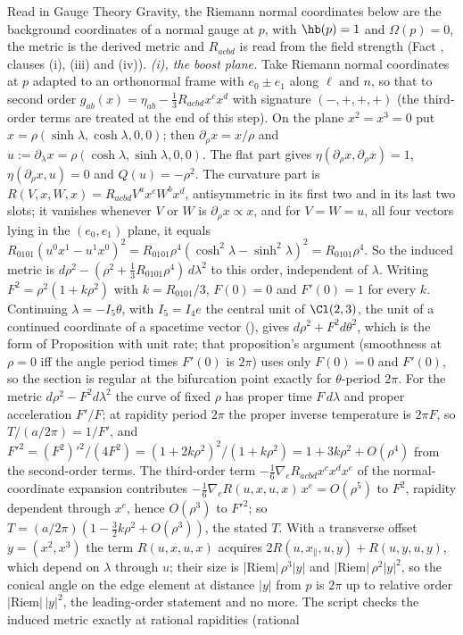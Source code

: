 Read in Gauge Theory Gravity, the Riemann normal coordinates below are the background coordinates of a normal gauge at $p$, with $\hb(p) = 1$ and $\Omega(p) = 0$, the metric is the derived metric and $R_{acbd}$ is read from the field strength (Fact , clauses (i), (iii) and (iv)). \emph{(i), the boost plane.} Take Riemann normal coordinates at $p$ adapted to an orthonormal frame with $e_{0} \pm e_{1}$ along $\ell$ and $n$, so that to second order $g_{ab}(x) = \eta_{ab} - \tfrac13 R_{acbd}x^{c}x^{d}$ with signature $(-,+,+,+)$ (the third-order terms are treated at the end of this step). On the plane $x^{2} = x^{3} = 0$ put $x = \rho(\sinh\lambda, \cosh\lambda, 0, 0)$; then $\partial_{\rho}x = x/\rho$ and $u := \partial_{\lambda}x = \rho(\cosh\lambda, \sinh\lambda, 0, 0)$. The flat part gives $\eta(\partial_{\rho}x, \partial_{\rho}x) = 1$, $\eta(\partial_{\rho}x, u) = 0$ and $Q(u) = -\rho^{2}$. The curvature part is $R(V, x, W, x) = R_{acbd}V^{a}x^{c}W^{b}x^{d}$, antisymmetric in its first two and in its last two slots; it vanishes whenever $V$ or $W$ is $\partial_{\rho}x \propto x$, and for $V = W = u$, all four vectors lying in the $(e_{0}, e_{1})$ plane, it equals $R_{0101}(u^{0}x^{1} - u^{1}x^{0})^{2} = R_{0101}\rho^{4}(\cosh^{2}\lambda - \sinh^{2}\lambda)^{2} = R_{0101}\rho^{4}$. So the induced metric is $d\rho^{2} - (\rho^{2} + \tfrac13R_{0101}\rho^{4})\,d\lambda^{2}$ to this order, independent of $\lambda$. Writing $F^{2} = \rho^{2}(1 + k\rho^{2})$ with $k = R_{0101}/3$, $F(0) = 0$ and $F'(0) = 1$ for every $k$. Continuing $\lambda = -I_5\theta$, with $I_5 = I_4e$ the central unit of $\Cl(2,3)$, the unit of a continued coordinate of a spacetime vector (), gives $d\rho^{2} + F^{2}d\theta^{2}$, which is the form of Proposition  with unit rate; that proposition's argument (smoothness at $\rho = 0$ iff the angle period times $F'(0)$ is $2\pi$) uses only $F(0) = 0$ and $F'(0)$, so the section is regular at the bifurcation point exactly for $\theta$-period $2\pi$. For the metric $d\rho^{2} - F^{2}d\lambda^{2}$ the curve of fixed $\rho$ has proper time $F\,d\lambda$ and proper acceleration $F'/F$; at rapidity period $2\pi$ the proper inverse temperature is $2\pi F$, so $T/(a/2\pi) = 1/F'$, and $F'^{2} = (F^{2})'^{2}/(4F^{2}) = (1 + 2k\rho^{2})^{2}/(1 + k\rho^{2}) = 1 + 3k\rho^{2} + O(\rho^{4})$ from the second-order terms. The third-order term $-\tfrac16\nabla_{e}R_{acbd}x^{c}x^{d}x^{e}$ of the normal-coordinate expansion contributes $-\tfrac16\nabla_{e}R(u, x, u, x)\,x^{e} = O(\rho^{5})$ to $F^{2}$, rapidity dependent through $x^{e}$, hence $O(\rho^{3})$ to $F'^{2}$; so $T = (a/2\pi)(1 - \tfrac32k\rho^{2} + O(\rho^{3}))$, the stated $T$. With a transverse offset $y = (x^{2}, x^{3})$ the term $R(u, x, u, x)$ acquires $2R(u, x_{\parallel}, u, y) + R(u, y, u, y)$, which depend on $\lambda$ through $u$; their size is $|\mathrm{Riem}|\,\rho^{3}|y|$ and $|\mathrm{Riem}|\,\rho^{2}|y|^{2}$, so the conical angle on the edge element at distance $|y|$ from $p$ is $2\pi$ up to relative order $|\mathrm{Riem}|\,|y|^{2}$, the leading-order statement and no more. The script checks the induced metric exactly at rational rapidities (rational 